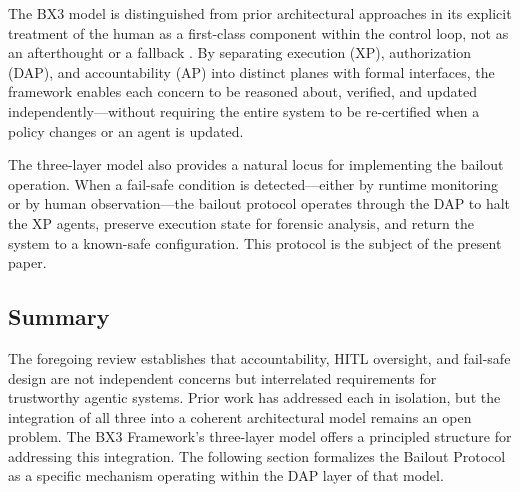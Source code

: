 The BX3 model is distinguished from prior architectural approaches in its explicit treatment of the human as a first-class component within the control loop, not as an afterthought or a fallback \cite{tristr81}. By separating execution (XP), authorization (DAP), and accountability (AP) into distinct planes with formal interfaces, the framework enables each concern to be reasoned about, verified, and updated independently—without requiring the entire system to be re-certified when a policy changes or an agent is updated.

The three-layer model also provides a natural locus for implementing the bailout operation. When a fail-safe condition is detected—either by runtime monitoring or by human observation—the bailout protocol operates through the DAP to halt the XP agents, preserve execution state for forensic analysis, and return the system to a known-safe configuration. This protocol is the subject of the present paper.

\subsection{Summary}

The foregoing review establishes that accountability, HITL oversight, and fail-safe design are not independent concerns but interrelated requirements for trustworthy agentic systems. Prior work has addressed each in isolation, but the integration of all three into a coherent architectural model remains an open problem. The BX3 Framework's three-layer model offers a principled structure for addressing this integration. The following section formalizes the Bailout Protocol as a specific mechanism operating within the DAP layer of that model.